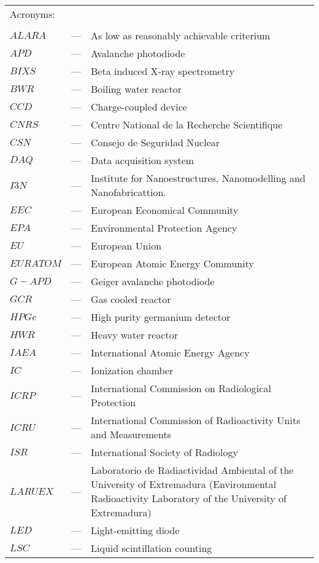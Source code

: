 \begin{longtable}{p{25mm} c p{120mm} }
\multicolumn{3}{l}{Acronyms:}\\
\\
$ALARA$ & --- & As low as reasonably achievable criterium\\
$APD$ & --- & Avalanche photodiode\\
$BIXS$ & --- & Beta induced X-ray spectrometry\\
$BWR$ & --- & Boiling water reactor\\
$CCD$ & --- & Charge-coupled device\\
$CNRS$ & --- & Centre National de la Recherche Scientifique\\
$CSN$ & --- & Consejo de Seguridad Nuclear\\
$DAQ$ & --- & Data acquisition system\\
$I3N$ & --- & Institute for Nanoestructures, Nanomodelling and Nanofabricattion.\\
$EEC$ & --- & European Economical Community\\
$EPA$ & --- & Environmental Protection Agency\\
$EU$ & --- & European Union\\
$EURATOM$ & --- & European Atomic Energy Community\\
$G-APD$ & --- & Geiger avalanche photodiode\\
$GCR$ & --- & Gas cooled reactor\\
$HPGe$ & --- & High purity germanium detector\\
$HWR$ & --- & Heavy water reactor\\
$IAEA$ & --- & International Atomic Energy Agency \\
$IC$ & --- & Ionization chamber\\
$ICRP$ & --- & International Commission on Radiological Protection \\
$ICRU$ & --- & International Commission of Radioactivity Units 
\newline
and Measurements\\
$ISR$ & --- & International Society of Radiology \\
$LARUEX$ & --- & Laboratorio de Radiactividad Ambiental of the University
\newline
of Extremadura (Environmental Radioactivity Laboratory
\newline
of the University of Extremadura)\\
$LED$ & --- & Light-emitting diode \\
$LSC$ & --- & Liquid scintillation counting\\

\end{longtable}
